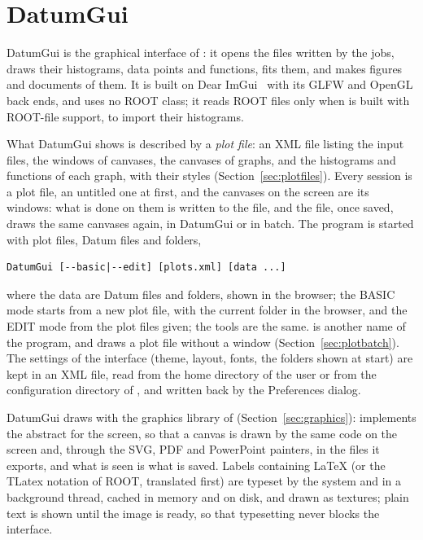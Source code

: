 \section{DatumGui}
\label{sec:capgui}

DatumGui is the graphical interface of \Datum{}: it opens the files written by the jobs, draws their histograms, data
points and functions, fits them, and makes figures and documents of them. It is built on Dear ImGui~\cite{DearImGui}
with its GLFW and OpenGL back ends, and uses no ROOT class; it reads ROOT files only when \Datum{} is built with
ROOT-file support, to import their histograms.

What DatumGui shows is described by a \emph{plot file}: an XML file listing the input files, the windows of canvases,
the canvases of graphs, and the histograms and functions of each graph, with their styles
(Section~\ref{sec:plotfiles}). Every session is a plot file, an untitled one at first, and the canvases on the screen
are its windows: what is done on them is written to the file, and the file, once saved, draws the same canvases again,
in DatumGui or in batch. The program is started with plot files, Datum files and folders,
{\footnotesize
\begin{verbatim}
DatumGui [--basic|--edit] [plots.xml] [data ...]
\end{verbatim}}
\noindent where the data are Datum files and folders, shown in the browser; the BASIC mode starts from a new plot file,
with the current folder in the browser, and the EDIT mode from the plot files given; the tools are the same.  is another name of the program, and
 draws a plot file without a window (Section~\ref{sec:plotbatch}). The settings of the interface
(theme, layout, fonts, the folders shown at start) are kept in an XML file, read from the home directory of the user
or from the configuration directory of \Datum{}, and written back by the Preferences dialog.

DatumGui draws with the graphics library of \Datum{} (Section~\ref{sec:graphics}):  implements the
abstract  for the screen, so that a canvas is drawn by the same code on the screen and, through the SVG,
PDF and PowerPoint painters, in the files it exports, and what is seen is what is saved. Labels containing \LaTeX{}
(or the TLatex notation of ROOT, translated first) are typeset by the system  and  in a
background thread, cached in memory and on disk, and drawn as textures; plain text is shown until the image is ready,
so that typesetting never blocks the interface.

